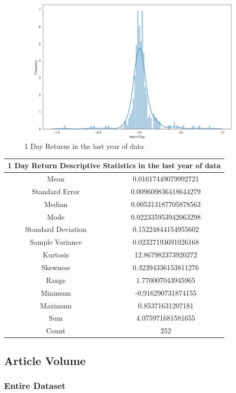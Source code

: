 \begin{figure}[h!]
\centering
\includegraphics[width=15cm,height=7cm,keepaspectratio]{resultsEvaluation/1returnDesc1.png}
\caption{1 Day Returns in the last year of data}
\label{fig:appendix_1returnDesc1}
\end{figure}
\begin{center}
\begin{tabular}{ c c }
\hline
\multicolumn{2}{|c|}{1 Day Return Descriptive Statistics in the last year of data} \\
\hline
Mean & 0.01617449079992721 \\
Standard Error & 0.009609836418644279 \\
Median & 0.005313187705878563 \\
Mode & 0.022335953942063298 \\
Standard Deviation & 0.15224844154955602 \\
Sample Variance & 0.02327193691026168 \\
Kurtosis & 12.867982373920272 \\
Skewness & 0.32394336153811276 \\
Range & 1.770007043945965 \\
Minimum & -0.916290731874155 \\
Maximum & 0.85371631207181 \\
Sum & 4.075971681581655 \\
Count & 252
\end{tabular}
\end{center}

\subsection{Article Volume}

\subsubsection{Entire Dataset}

